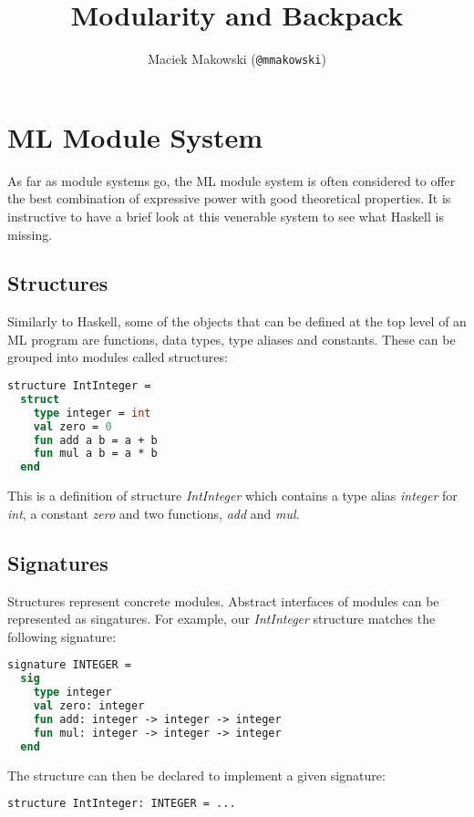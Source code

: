 \documentclass[11pt,twoside,a4paper]{article} %
\begin{document}
\title{Modularity and Backpack}
\author{Maciek Makowski (\texttt{@mmakowski})}
\maketitle

\newcommand{\code}[1]{\textit{#1}}

\section{ML Module System}

As far as module systems go, the ML module system is often considered to offer the best combination of expressive power with good theoretical properties\cite{Dreyer05}. It is instructive to have a brief look at this venerable system to see what Haskell is missing.

\subsection{Structures}

Similarly to Haskell, some of the objects that can be defined at the top level of an ML program are functions, data types, type aliases and constants. These can be grouped into modules called structures:

\begin{lstlisting}[language=ML]
structure IntInteger =
  struct
    type integer = int
    val zero = 0
    fun add a b = a + b
    fun mul a b = a * b
  end
\end{lstlisting}
This is a definition of structure \code{IntInteger} which contains a type alias \code{integer} for \code{int}, a constant \code{zero} and two functions, \code{add} and \code{mul}. 

\subsection{Signatures}

Structures represent concrete modules. Abstract interfaces of modules can be represented as singatures. For example, our \code{IntInteger} structure matches the following signature:
\begin{lstlisting}[language=ML]
signature INTEGER =
  sig
    type integer
    val zero: integer
    fun add: integer -> integer -> integer
    fun mul: integer -> integer -> integer
  end
\end{lstlisting}
The structure can then be declared to implement a given signature:
\begin{lstlisting}[language=ML]
structure IntInteger: INTEGER = ...
\end{lstlisting}
\end{document}
